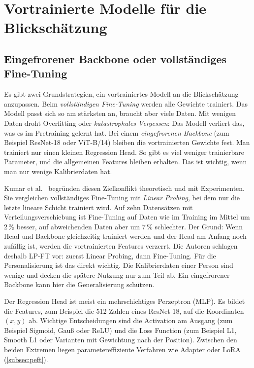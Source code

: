 \section{Vortrainierte Modelle für die Blickschätzung}
\label{sec:pretrained}
\subsection{Eingefrorener Backbone oder vollständiges Fine-Tuning}
\label{subsec:frozen_full}
Es gibt zwei Grundstrategien, ein vortrainiertes Modell an die
Blickschätzung anzupassen. Beim \emph{vollständigen Fine-Tuning} werden alle
Gewichte trainiert. Das Modell passt sich so am stärksten an, braucht aber
viele Daten. Mit wenigen Daten droht Overfitting oder
\emph{katastrophales Vergessen}: Das Modell verliert das, was es im Pretraining
gelernt hat. Bei einem \emph{eingefrorenen Backbone} (zum Beispiel ResNet-18
oder ViT-B/14) bleiben die vortrainierten Gewichte fest. Man trainiert nur
einen kleinen Regression Head. So gibt es viel weniger trainierbare Parameter,
und die allgemeinen Features bleiben erhalten. Das ist wichtig, wenn man nur
wenige Kalibrierdaten hat.

Kumar et al.~\cite{kumar2022finetuning} begründen diesen Zielkonflikt
theoretisch und mit Experimenten. Sie vergleichen vollständiges Fine-Tuning mit
\emph{Linear Probing}, bei dem nur die letzte lineare Schicht trainiert wird.
Auf zehn Datensätzen mit Verteilungsverschiebung ist Fine-Tuning auf Daten wie
im Training im Mittel um 2\,\% besser, auf abweichenden Daten aber um 7\,\%
schlechter. Der Grund: Wenn Head und Backbone gleichzeitig trainiert werden und
der Head am Anfang noch zufällig ist, werden die vortrainierten Features
verzerrt. Die Autoren schlagen deshalb LP-FT vor: zuerst Linear Probing, dann
Fine-Tuning. Für die Personalisierung ist das direkt wichtig. Die
Kalibrierdaten einer Person sind wenige und decken die spätere Nutzung nur zum
Teil ab. Ein eingefrorener Backbone kann hier die Generalisierung schützen.

Der Regression Head ist meist ein mehrschichtiges Perzeptron (MLP). Es bildet
die Features, zum Beispiel die 512 Zahlen eines ResNet-18, auf die Koordinaten
$(x, y)$ ab. Wichtige Entscheidungen sind die Activation am Ausgang (zum
Beispiel Sigmoid, Gauß oder ReLU) und die Loss Function (zum Beispiel L1,
Smooth L1 oder Varianten mit Gewichtung nach der Position). Zwischen den beiden
Extremen liegen parametereffiziente Verfahren wie Adapter oder
LoRA~\cite{hu2022lora} (\cref{subsec:peft}).


